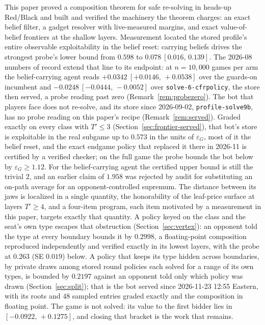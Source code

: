 \documentclass[11pt]{article}
\theoremstyle{plain}
\theoremstyle{definition}
\theoremstyle{remark}
\newcommand{\code}[1]{\texttt{\small #1}}
\newcommand{\game}{\ensuremath{G}}
\newcommand{\epsG}{\ensuremath{\varepsilon_{\game}}}
\begin{document}
This paper proved a composition theorem for safe re-solving in
heads-up Red/Black and built and verified the machinery the theorem
charges: an exact belief filter, a gadget resolver with live-measured
margins, and exact value-of-belief frontiers at the shallow layers.
Measurement located the stored profile's entire observable
exploitability in the belief reset: carrying beliefs drives the
strongest probe's lower bound from $0.598$ to $0.078\ [0.016,\,0.139]$.
The 2026-08 numbers of record extend that line to its endpoint: at
$n=10{,}000$ games per arm the belief-carrying agent reads
$+0.0342\ [+0.0146,\,+0.0538]$ over the guards-on incumbent and
$-0.0248\ [-0.0444,\,-0.0052]$ over \code{solve-6-cfrpolicy}, the
store then served, a probe reading past zero
(Remark~\ref{rem:probezero}). The bot that players face does not
re-solve, and its store since 2026-09-02, \code{profile-solve9b}, has
no probe reading on this paper's recipe (Remark~\ref{rem:served}).
Graded exactly on every class with $T'\le3$
(Section~\ref{sec:frontier-served}), that bot's store is exploitable
in the real subgame up to $0.573$ in the units of $\epsG$, most
of it the belief reset, and the exact endgame policy that replaced it
there in 2026-11 is certified by a verified checker; on the full game
the probe bounds the bot below by $\epsG\ge1.12$.
For the belief-carrying agent the certified upper bound is still the
trivial $2$, and an earlier claim of $1.958$ was rejected by audit for
substituting an on-path average for an opponent-controlled supremum.
The distance between its jaws is localized in a single quantity, the
honorability of the leaf-price surface at layers $T'\ge4$, and a
four-item program, each item motivated by a measurement in this
paper, targets exactly that quantity. A policy keyed on the class and
the seat's own type escapes that obstruction
(Section~\ref{sec:vertex}): an opponent told the type at every
boundary bounds it by $0.2998$, a floating-point composition reproduced
independently and verified exactly in its lowest layers, with the
probe at $0.263$ (SE $0.019$) below. A policy that keeps its type
hidden across boundaries, by private draws among stored round policies
each solved for a range of its own types, is bounded by $0.2197$ against
an opponent told only which policy was drawn
(Section~\ref{sec:split}); that is the bot served since 2026-11-23
12:55 Eastern, with its roots and $48$ sampled entries graded exactly
and the composition in floating point. The game is not solved: its
value to the first bidder lies in $[-0.0922,\,+0.1275]$, and closing
that bracket is the work that remains.
\end{document}
